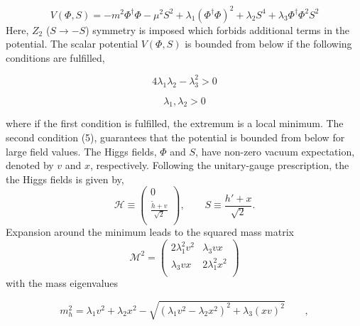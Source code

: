 \begin{equation}
 V(\Phi, S)= -m^2   \Phi ^{\dagger}\Phi -\mu^2 S^2 +\lambda_1 (\Phi ^{\dagger}\Phi)^2 +\lambda_2 S^4 + \lambda_3 \Phi ^{\dagger}\Phi^2 S^2  \end{equation}
Here, $Z_2$ ($S \rightarrow -S$) symmetry is imposed which forbids additional terms in the potential.
The scalar potential $V(\Phi, S)$ is bounded from below if the following conditions are fulfilled,

\begin{equation}
 4 \lambda_1  \lambda_2 - \lambda_3^2 >0    \end{equation}

\begin{equation}
 \lambda_1 , \lambda_2  >0    \end{equation}

where if the first condition is fulfilled, the extremum is a local minimum. The
second condition (5), guarantees that the potential is bounded from below for large field values.
The Higgs fields, $\Phi$ and $S$, have non-zero vacuum expectation, denoted by $v$ and $x$, respectively.
Following the unitary-gauge prescription, the the Higgs fields is given by,
\newline
$$
{\mathcal H} \equiv \left(
\begin{array}{c}
0  \\
\frac{\tilde{h}+v }{\sqrt{2}}  \\
\end{array}
\right)
, \qquad 
S \equiv \frac{h'+x }{\sqrt{2}}
.
$$
Expansion around the minimum leads to the squared mass matrix
\newline
$$
{\mathcal M}^2 = \left(
\begin{array}{cc}
2 \lambda_1^2 v^2 & \lambda_3 vx  \\
\lambda_3 vx & 2 \lambda_1^2 x^2 \\

\end{array}
\right)
$$
\newline
with the mass eigenvalues

\begin{equation}
 m_h^2=  \lambda_1 v^2 + \lambda_2 x^2 -\sqrt{(\lambda_1 v^2 - \lambda_2 x^2)^2 +\lambda_3 (xv)^2 } \qquad,  \end{equation}

